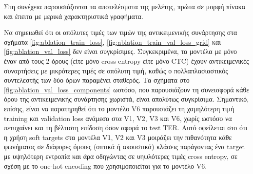Στη συνέχεια παρουσιάζονται τα αποτελέσματα της μελέτης, πρώτα σε μορφή πίνακα και έπειτα με μερικά χαρακτηριστικά γραφήματα.

Να σημειωθεί ότι οι απόλυτες τιμές των τιμών της αντικειμενικής συνάρτησης στα σχήματα \ref{fig:ablation_train_loss}, \ref{fig:ablation_train_val_loss_grid} και \ref{fig:ablation_val_loss} δεν είναι συγκρίσιμες. Συγκεκριμένα, τα μοντέλα με μόνο έναν από τους 2 όρους (είτε μόνο cross entropy είτε μόνο CTC) έχουν αντικειμενικές συναρτήσεις με μικρότερες τιμές σε απόλυτη τιμή, καθώς ο πολλαπλασιαστικός συντελεστής των δύο όρων παραμένει σταθερός. Τα σχήματα στο \ref{fig:ablation_val_loss_components} ωστόσο, που παρουσιάζουν τη συνεισφορά κάθε όρου της αντικειμενικής συνάρτησης χωριστά, είναι απολύτως συγκρίσιμα. Σημαντικό, επίσης, είναι να παρατηρηθεί ότι το μοντέλο V6 παρουσιάζει τη χαμηλότερη τιμή training και validation loss ανάμεσα στα V1, V2, V3 και V6, χωρίς ωστόσο να πετυχαίνει και τη βέλτιστη επίδοση όσον αφορά το test TER. Αυτό οφείλεται στο ότι η χρήση soft targets στα μοντέλα V1, V2 και V3 μοιράζει την πιθανότητα κάθε φωνήματος σε διάφορες όμοιες (οπτικά ή ακουστικά) κλάσεις παράγοντας ένα target με υψηλότερη εντροπία και άρα οδηγώντας σε υηψλότερες τιμές cross entropy, σε σχέση με το one-hot encoding που χρησιμοποιείται για το μοντέλο V6.

